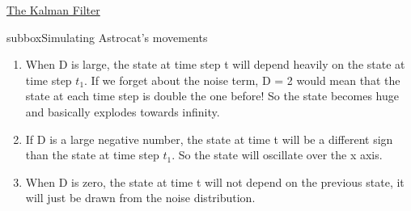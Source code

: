 \begin{textbox}{\href{http://instructor.compneuro.neuromatch.io/tutorials/W3D2_HiddenDynamics/instructor/W3D2_Tutorial3.html}{The Kalman Filter }   }
\begin{subbox}{subbox}{Simulating Astrocat's movements}
\begin{enumerate}
    \item 
When D is large, the state at time step t will depend heavily on the state at time
   step $t_1$. If we forget about the noise term, D = 2 would mean that the state at each
   time step is double the one before! So the state becomes huge and basically explodes towards
   infinity.

\item If D is a large negative number, the state at time t will be a different sign than the
   state at time step $t_1$. So the state will oscillate over the x axis.

\item When D is zero, the state at time t will not depend on the previous state, it will just
   be drawn from the noise distribution.
   \end{enumerate} 
\end{subbox}

\end{textbox}
